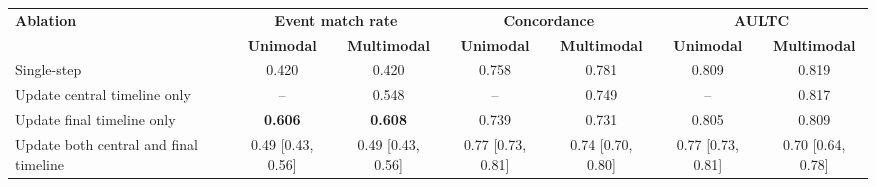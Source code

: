 \begin{table}[t]
{\footnotesize
\setlength{\tabcolsep}{6pt}
\renewcommand{\arraystretch}{1.15}
{
\begin{adjustbox}{max width=\textwidth}
\begin{tabular}{lcccccc}
\hline
\multirow{2}{*}{\textbf{Ablation}} 
& \multicolumn{2}{c}{\textbf{Event match rate}} 
& \multicolumn{2}{c}{\textbf{Concordance}} 
& \multicolumn{2}{c}{\textbf{AULTC}} \\
\cline{2-7}
& \textbf{Unimodal} & \textbf{Multimodal} 
& \textbf{Unimodal} & \textbf{Multimodal} 
& \textbf{Unimodal} & \textbf{Multimodal} \\
\hline
Single-step                         & 0.420 & 0.420 & 0.758 & 0.781 & 0.809 & 0.819 \\
Update central timeline only        & --    & 0.548 & --    & 0.749 & --    & 0.817 \\
Update final timeline only          & \textbf{0.606} & \textbf{0.608} & 0.739 & 0.731 & 0.805 & 0.809 \\
Update both central and final timeline 
& 0.49 [0.43, 0.56]
& 0.49 [0.43, 0.56]
& 0.77 [0.73, 0.81]
& 0.74 [0.70, 0.80]
& 0.77 [0.73, 0.81]
& 0.70 [0.64, 0.78]\\
\hline
\end{tabular}
\end{adjustbox}
}
\label{tab:ablation_results}
}
\end{table}
